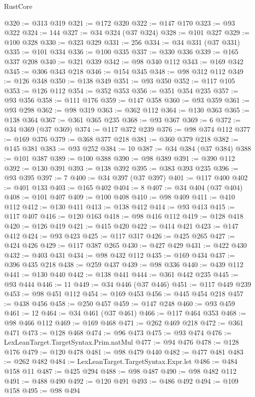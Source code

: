 \begin{lexlean}{RustCore}
\begin{coremodule}
@320 := @313 @319
@321 := @172 @320
@322 := @147 @170
@323 := @93 @322
@324 := 144
@327 := @34 @324 (@37 @324)
@328 := @101 @327
@329 := @100 @328
@330 := @323 @329
@331 := 256
@334 := @34 @331 (@37 @331)
@335 := @101 @334
@336 := @100 @335
@337 := @330 @336
@339 := @165 @337 @208
@340 := @321 @339
@342 := @98 @340 @112
@343 := @169 @342
@345 := @306 @343 @218
@346 := @154 @345
@348 := @98 @312 @112
@349 := @126 @348
@350 := @138 @349
@351 := @93 @350
@352 := @117 @105
@353 := @126 @112
@354 := @352 @353
@356 := @351 @354 @235
@357 := @93 @356
@358 := @111 @176
@359 := @147 @358
@360 := @93 @359
@361 := @93 @298
@362 := @98 @319
@363 := @362 @112
@364 := @130 @363
@365 := @138 @364
@367 := @361 @365 @235
@368 := @93 @367
@369 := 6
@372 := @34 @369 (@37 @369)
@374 := @117 @372 @239
@376 := @98 @374 @112
@377 := @169 @376
@379 := @368 @377 @218
@381 := @360 @379 @218
@382 := @145 @381
@383 := @93 @252
@384 := 10
@387 := @34 @384 (@37 @384)
@388 := @101 @387
@389 := @100 @388
@390 := @98 @389
@391 := @390 @112
@392 := @130 @391
@393 := @138 @392
@395 := @383 @393 @235
@396 := @93 @395
@397 := 7
@400 := @34 @397 (@37 @397)
@401 := @117 @400
@402 := @401 @133
@403 := @165 @402
@404 := 8
@407 := @34 @404 (@37 @404)
@408 := @101 @407
@409 := @100 @408
@410 := @98 @409
@411 := @410 @112
@412 := @130 @411
@413 := @138 @412
@414 := @93 @413
@415 := @117 @407
@416 := @120 @163
@418 := @98 @416 @112
@419 := @128 @418
@420 := @126 @419
@421 := @415 @420
@422 := @414 @421
@423 := @147 @412
@424 := @93 @423
@425 := @117 @317
@426 := @425 @265
@427 := @424 @426
@429 := @117 @387 @265
@430 := @427 @429
@431 := @422 @430
@432 := @403 @431
@434 := @98 @432 @112
@435 := @169 @434
@437 := @396 @435 @218
@438 := @259 @437
@439 := @98 @336
@440 := @439 @112
@441 := @130 @440
@442 := @138 @441
@444 := @361 @442 @235
@445 := @93 @444
@446 := 11
@449 := @34 @446 (@37 @446)
@451 := @117 @449 @239
@453 := @98 @451 @112
@454 := @169 @453
@456 := @445 @454 @218
@457 := @438 @456
@458 := @250 @457
@459 := @147 @248
@460 := @93 @459
@461 := 12
@464 := @34 @461 (@37 @461)
@466 := @117 @464 @353
@468 := @98 @466 @112
@469 := @169 @468
@471 := @262 @469 @218
@472 := @361 @471
@473 := @128 @468
@474 := @96 @473
@475 := @93 @474
@476 := LexLeanTarget.TargetSyntax.Prim.natMul
@477 := @94 @476
@478 := @128 @176
@479 := @120 @478
@481 := @98 @479 @440
@482 := @477 @481
@483 := @262 @482
@484 := LexLeanTarget.TargetSyntax.Expr.let
@486 := @484 @158 @11
@487 := @425 @294
@488 := @98 @487
@490 := @98 @482 @112
@491 := @488 @490
@492 := @120 @491
@493 := @486 @492
@494 := @109 @158
@495 := @98 @494

\end{coremodule}
\end{lexlean}
